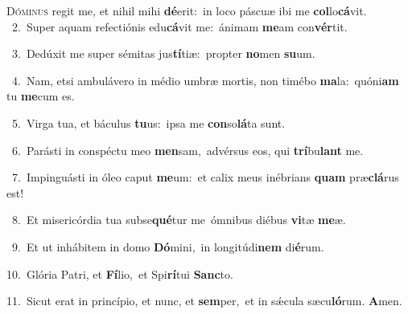 \lettrine{\initial\textcolor{\initialcolor}{D}}{óminus} regit me, et nihil mihi \textbf{dé}\-erit:~\star in loco páscuæ ibi me \textbf{col}\-lo\-\textbf{cá}\-vit.\\
{\numbfont\textcolor{\numbcolor}{~2.}}~Super aquam refectiónis edu\-\textbf{cá}\-vit me:~\star ánimam \textbf{me}\-am con\-\textbf{vér}\-tit.\par
{\numbfont\textcolor{\numbcolor}{~3.}}~Dedúxit me super sémitas jus\-\textbf{tí}\-tiæ:~\star propter \textbf{no}\-men \textbf{su}\-um.\par
{\numbfont\textcolor{\numbcolor}{~4.}}~Nam, etsi ambulávero in médio umbræ mortis, non timébo \textbf{ma}\-la:~\star quóni\textbf{am} tu \textbf{me}\-cum es.\par
{\numbfont\textcolor{\numbcolor}{~5.}}~Virga tua, et báculus \textbf{tu}\-us:~\star ipsa me \textbf{con}\-so\-\textbf{lá}\-ta sunt.\par
{\numbfont\textcolor{\numbcolor}{~6.}}~Parásti in conspéctu meo \textbf{men}\-sam,~\star advérsus eos, qui \textbf{trí}\-bu\textbf{lant} me.\par
{\numbfont\textcolor{\numbcolor}{~7.}}~Impinguásti in óleo caput \textbf{me}\-um:~\star et calix meus inébrians \textbf{quam} præ\-\textbf{clá}\-rus est!\par
{\numbfont\textcolor{\numbcolor}{~8.}}~Et misericórdia tua subse\-\textbf{qué}\-tur me~\star ómnibus diébus \textbf{vi}\-tæ \textbf{me}\-æ.\par
{\numbfont\textcolor{\numbcolor}{~9.}}~Et ut inhábitem in domo \textbf{Dó}\-mini,~\star in longitúdi\textbf{nem} di\-\textbf{é}\-rum.\par
{\numbfont\textcolor{\numbcolor}{10.}}~Glória Patri, et \textbf{Fí}\-lio,~\star et Spi\-\textbf{rí}\-tui \textbf{Sanc}\-to.\par
{\numbfont\textcolor{\numbcolor}{11.}}~Sicut erat in princípio, et nunc, et \textbf{sem}\-per,~\star et in sǽcula sæcu\-\textbf{ló}\-rum. \textbf{A}\-men.\par
